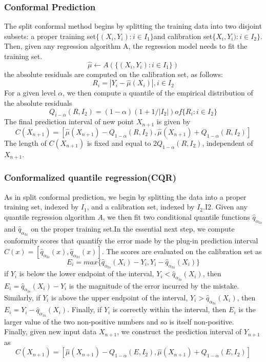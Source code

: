 \documentclass{article}
\begin{document}
\subsubsection{Conformal Prediction}
The split conformal method begins by splitting the training data into two disjoint subsets: a proper training set$\{(X_i, Y_i):i\in I_1\}$and calibration set$\{X_i, Y_i):i\in I_2\}$. Then, given any regression algorithm A, the regression model needs to fit the training set.
\[\hat{\mu}\leftarrow A(\{(X_i, Y_i):i\in I_1\})\]
the absolute residuals are computed on the calibration set, as follows:
\[R_i=|Y_i-\hat{\mu}(X_i)|, i\in I_2\]
For a given level $\alpha$, we then compute a quantile of the empirical distribution of the absolute residuals
\[Q_{i-\alpha}(R,I_2)=(1-\alpha)(1+1/|I_2|) of \{R_i:i \in I_2\}\]
The final prediction interval of new point $X_{n+1}$ is given by
\[C(X_{n+1})=[\hat{\mu}(X_{n+1})-Q_{1-\alpha}(R,I_2),\hat{\mu}(X_{n+1})+Q_{1-\alpha}(R,I_2)]\]
The length of $C(X_{n+1})$ is fixed and equal to $2Q_{1-\alpha}(R,I_2)$, independent of $X_{n+1}$.
\subsubsection{Conformalized quantile regression(CQR)}
As in split conformal prediction, we begin by splitting the data into a
proper training set, indexed by $I_1$, and a calibration set, indexed by $I_2$.I2. Given any quantile regression algorithm $A$, we then fit two conditional quantile functions $\hat{q}_{\alpha_{lo}}$ and $\hat{q}_{\alpha_{hi}}$ on the proper training set.In the essential next step, we compute conformity scores that quantify the error made by the plug-in prediction interval $\hat{C}(x)=[\hat{q}_{\alpha_{lo}}(x),\hat{q}_{\alpha_{hi}}(x)]$. The scores are evaluated on the calibration set as
\[E_i=max\{\hat{q}_{\alpha_{lo}}(X_i)-Y_i,Y_i-\hat{q}_{\alpha_{hi}}(X_i)\}\]
if $Y_i$ is below the lower endpoint of the interval, $Y_i<\hat{q}_{\alpha_{lo}}(X_i)$, then $E_i=\hat{q}_{\alpha_{lo}}(X_i)-Y_i$ is the magnitude of the error incurred by the mistake. Similarly, if $Y_i$ is above the upper endpoint of the interval, $Y_i>\hat{q}_{\alpha_{hi}}(X_i)$, then$E_i=Y_i-\hat{q}_{\alpha_{hi}}(X_i)$. Finally, if $Y_i$ is correctly within the interval, then $E_i$ is the larger value of the two non-positive numbers and so is itself non-positive.\\
Finally, given new input data $X_{n+1}$, we construct the prediction interval of $Y_{n+1}$ as 
\[C(X_{n+1})=[\hat{\mu}(X_{n+1})-Q_{1-\alpha}(E,I_2),\hat{\mu}(X_{n+1})+Q_{1-\alpha}(E,I_2)]\]
\end{document}
